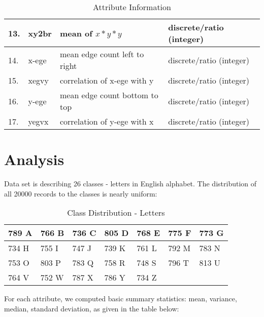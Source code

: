 \begin{table}[ht!]
\begin{tabular}{|l|l|l|l|}
            13. & xy2br & mean of $x * y * y$        & discrete/ratio (integer)   \\ \hline
            14. & x-ege & mean edge count left to right  & discrete/ratio (integer) \\ \hline
            15. & xegvy & correlation of x-ege with y    & discrete/ratio (integer) \\ \hline
            16. & y-ege & mean edge count bottom to top  & discrete/ratio (integer) \\ \hline
            17. & yegvx & correlation of y-ege with x    & discrete/ratio (integer) \\ \hline
    \end{tabular}
    \caption{Attribute Information}
\end{table}

\section*{Analysis}

Data set is describing 26 classes - letters in English alphabet. The distribution
of all 20000 records to the classes is nearly uniform: \\

\begin{table}[ht!]
    \centering
    \begin{tabular}{|l|l|l|l|l|l|l|}
         \hline
            789 A  &  766 B  &   736 C  &   805 D  &  768 E   &  775 F  &   773 G \\ \hline
            734 H  &  755 I  &   747 J  &   739 K  &  761 L   &  792 M  &   783 N \\ \hline
            753 O  &  803 P  &   783 Q  &   758 R  &  748 S   &  796 T  &   813 U \\ \hline
            764 V  &  752 W  &   787 X  &   786 Y  &  734 Z   &         &         \\ \hline
    \end{tabular}
    \caption{Class Distribution - Letters}
\end{table}

\noindent
For each attribute, we computed basic summary statistics: mean, variance,
median, standard deviation, as given in the table below: \\

